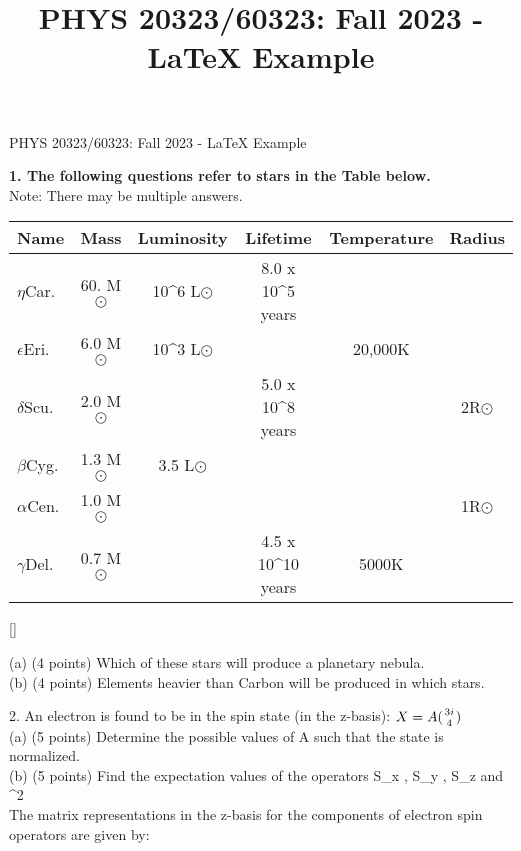 \documentclass{article}
\title{\teftbf PHYS 20323/60323: Fall 2023 - LaTeX Example}
\begin{document}
\begin{center}
    {\normalsize PHYS 20323/60323: Fall 2023 - LaTeX Example}
\end{center}


{\normalsize \textbf {1. The following questions refer to stars in the Table below.}}\\
Note: There may be multiple answers.

{\normalsize{

\begin{center}
\begin{tabular}{|l|c|c|c|c|c|}\hline
Name & Mass & Luminosity & Lifetime & Temperature & Radius & \\\hline
$\eta$Car.    & 60. M{\footnotesize $\odot$}  &  10^6 L{\footnotesize $\odot$} & 8.0 x 10^5 years & & &\\\hline
$\epsilon$Eri.& 6.0 M{\footnotesize $\odot$} &  10^3 L{\footnotesize $\odot$}& & 20,000K  & &\\\hline
$\delta$Scu.  & 2.0 M{\footnotesize $\odot$} & & 5.0 x 10^8 years & & 2R{\footnotesize $\odot$} &\\\hline
$\beta$Cyg.   & 1.3 M{\footnotesize $\odot$} &  3.5 L{\footnotesize $\odot$} & & & &\\\hline
$\alpha$Cen.  & 1.0 M{\footnotesize $\odot$} & & & & 1R{\footnotesize $\odot$} &\\\hline
$\gamma$Del.  & 0.7 M{\footnotesize $\odot$} & & 4.5 x 10^{10} years & 5000K & &\\\hline



\end{tabular}[]
\end{center}

}}

(a) (4 points) Which of these stars will produce a planetary nebula.\\

(b) (4 points) Elements heavier than Carbon will be produced in which stars.\\

{\normalsize{

{\normalsize 2. An electron is found to be in the spin state (in the z-basis)}:    $X = A ({3i\atop4})$ {\fo}\\

(a) (5 points) Determine the possible values of A such that the state is normalized.\\

(b) (5 points) Find the expectation values of the operators {\color{red}S_x} , 
 {\color{purple}S_y} , {\color{orange}S_z} {\color{black} and  ^2}\\

{\color{black} The matrix representations in the z-basis for the components of electron spin operators are given by:}

}}
\end{document}
